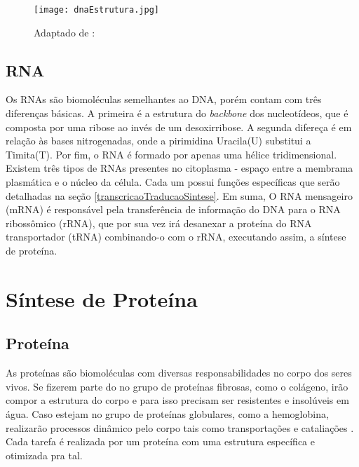 \begin{figure}[h]
    \centering
    \texttt{[image: dnaEstrutura.jpg]}
    \caption{Adaptado de : \cite{dnadiscovery08} }
    \label{fig:EstruturasDoDNA}
\end{figure} 


\subsection{RNA} \label{aceidosNucleicos:rna}

\indent Os RNAs são biomoléculas semelhantes ao DNA, porém contam com três diferenças básicas. A primeira é a estrutura do \textit{backbone} dos nucleotídeos, que é composta por uma ribose ao invés de um desoxirribose. A segunda difereça é em relação às bases nitrogenadas, onde a pirimidina Uracila(U) substitui a Timita(T). 
Por fim, o RNA é formado por apenas uma hélice tridimensional. \\

\indent Existem três tipos de RNAs presentes no citoplasma - espaço entre a membrama plasmática e o núcleo da célula. 
Cada um possui funções específicas que serão detalhadas na seção \ref{transcricaoTraducaoSintese}. Em suma, O RNA mensageiro (mRNA) é responsável pela transferência de informação do DNA para o RNA ribossômico (rRNA), que por sua vez irá desanexar a proteína do RNA transportador (tRNA) combinando-o com o rRNA, executando assim, a síntese de proteína. \\




\section{Síntese de Proteína} \label{sinteseDeProteina}



\subsection{Proteína} \label{sinteseDeProteina:proteina}

\indent As proteínas são biomoléculas com diversas responsabilidades no corpo dos seres vivos. 
Se fizerem parte do no grupo de proteínas fibrosas, como o colágeno, irão compor a estrutura do corpo e para isso precisam ser resistentes e insolúveis em água. Caso estejam no grupo de proteínas globulares, como a hemoglobina, realizarão processos dinâmico pelo corpo tais como transportações e cataliações \cite{profangela11}.  Cada tarefa é realizada por um proteína com uma estrutura específica e otimizada pra tal. \\

